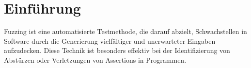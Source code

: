 
\section{Einführung}\label{sec:introduction}
Fuzzing ist eine automatisierte Testmethode, die darauf abzielt, Schwachstellen in Software durch die Generierung vielfältiger
und unerwarteter Eingaben aufzudecken.
Diese Technik ist besonders effektiv bei der Identifizierung von Abstürzen oder Verletzungen von Assertions in Programmen.